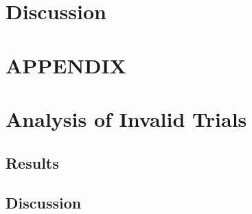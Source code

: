 \documentclass[prodmode,acmtap]{acmlarge}
\begin{document}
\section{Discussion}


\appendix
\section*{APPENDIX}
\setcounter{section}{1}









\elecappendix


\section{Analysis of Invalid Trials}
\label{invalid}

\subsection{Results}





\subsection{Discussion}
\end{document}
